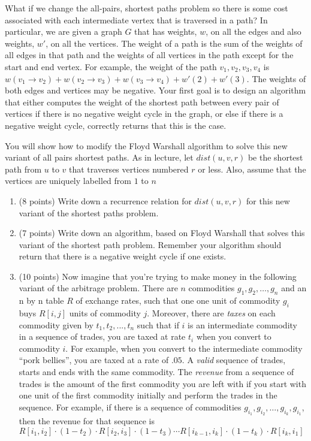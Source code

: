 \documentclass[11pt]{article}
\begin{document}
\begin{enumerate}
What if we change the all-pairs, shortest paths problem so there is some cost associated with each intermediate vertex that is traversed in a path?  In particular, we are given a graph $G$ that has weights, $w$, on all the edges and also weights, $w'$, on all the vertices.  The weight of a path is the sum of the weights of all edges in that path and the weights of all vertices in the path except for the start and end vertex.  For example, the weight of the path $v_{1}, v_{2}, v_{3}, v_{4}$ is $w(v_{1} \rightarrow v_{2}) + w(v_{2} \rightarrow v_{3}) + w(v_{3} \rightarrow v_{4}) + w'(2) + w'(3)$.  The weights of both edges and vertices may be negative.  Your first goal is to design an algorithm that either computes the weight of the shortest path between every pair of vertices if there is no negative weight cycle in the graph, or else if there is a negative weight cycle, correctly returns that this is the case.

You will show how to modify the Floyd Warshall algorithm to solve this new variant of all pairs shortest paths.  As in lecture, let $dist(u,v,r)$ be the shortest path from $u$ to $v$ that traverses vertices numbered $r$ or less.  Also, assume that the vertices are uniquely labelled from $1$ to $n$

\begin{enumerate}
\item (8 points) Write down a recurrence relation for $dist(u,v,r)$ for this new variant of the shortest paths problem. 

\pagebreak

\item (7 points) Write down an algorithm, based on Floyd Warshall that solves this variant of the shortest path problem.  Remember your algorithm should return that there is a negative weight cycle if one exists.


\pagebreak

\item (10 points) Now imagine that you're trying to make money in the following variant of the arbitrage problem.  There are $n$ commodities $g_{1}, g_{2}, \ldots, g_{n}$ and an n by n table $R$ of exchange rates, such that one one unit of commodity $g_{i}$ buys $R[i,j]$ units of commodity $j$.  Moreover, there are \emph{taxes} on each commodity given by $t_{1}, t_{2}, ..., t_{n}$ such that if $i$ is an intermediate commodity in a sequence of trades, you are taxed at rate $t_{i}$ when you convert to commodity $i$.  For example, when you convert to the intermediate commodity ``pork bellies'', you are taxed at a rate of $.05$.  A \emph{valid} sequence of trades, starts and ends with the same commodity.  The \emph{revenue} from a sequence of trades is the amount of the first commodity you are left with if you start with one unit of the first commodity initially and perform the trades in the sequence.  For example, if there is a sequence of commodities $g_{i_{1}}, g_{i_{2}}, \ldots, g_{i_{k}}, g_{i_{1}}$, then the revenue for that sequence is\\ $R[i_{1},i_{2}]\cdot (1 - t_{2}) \cdot R[i_{2}, i_{3}] \cdot(1 -  t_{3}) \cdots R[i_{k-1},i_{k}] \cdot (1- t_{k}) \cdot R[i_{k},i_{1}]$


\end{enumerate}
\end{enumerate}
\end{document}
